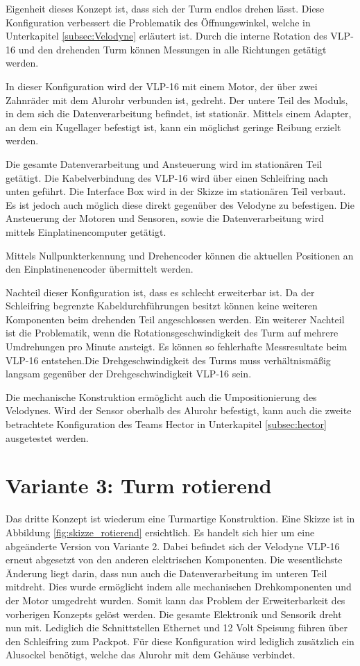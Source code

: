 Eigenheit dieses Konzept ist, dass sich der Turm endlos drehen lässt. Diese Konfiguration verbessert die Problematik des Öffnungswinkel, welche in Unterkapitel \ref{subsec:Velodyne} erläutert ist. Durch die interne Rotation des VLP-16 und den drehenden Turm können Messungen in alle Richtungen getätigt werden. 

In dieser Konfiguration wird der VLP-16 mit einem Motor, der über zwei Zahnräder mit dem Alurohr verbunden ist, gedreht. Der untere Teil des Moduls, in dem sich die Datenverarbeitung befindet, ist stationär. Mittels einem Adapter, an dem ein Kugellager befestigt ist, kann ein möglichst geringe Reibung erzielt werden.

Die gesamte Datenverarbeitung und Ansteuerung wird im stationären Teil getätigt. Die Kabelverbindung des VLP-16 wird über einen Schleifring nach unten geführt. Die Interface Box wird in der Skizze im stationären Teil verbaut. Es ist jedoch auch möglich diese direkt gegenüber des Velodyne zu befestigen. Die Ansteuerung der Motoren und Sensoren, sowie die Datenverarbeitung wird mittels Einplatinencomputer getätigt.

Mittels Nullpunkterkennung und Drehencoder können die aktuellen Positionen an den Einplatinenencoder übermittelt werden.

Nachteil dieser Konfiguration ist, dass es schlecht erweiterbar ist. Da der Schleifring begrenzte Kabeldurchführungen besitzt können keine weiteren Komponenten beim drehenden Teil angeschlossen werden. Ein weiterer Nachteil ist die Problematik, wenn die Rotationsgeschwindigkeit des Turm auf mehrere Umdrehungen pro Minute ansteigt. Es können so fehlerhafte Messresultate beim VLP-16 entstehen.Die Drehgeschwindigkeit des Turms muss verhältnismäßig langsam gegenüber der Drehgeschwindigkeit VLP-16 sein.

Die mechanische Konstruktion ermöglicht auch die Umpositionierung des Velodynes. Wird der Sensor oberhalb des Alurohr befestigt, kann auch die zweite betrachtete Konfiguration des Teams Hector in Unterkapitel \ref{subsec:hector} ausgetestet werden.

\section {Variante 3: Turm rotierend}
\label{sec:var3}
Das dritte Konzept ist wiederum eine Turmartige Konstruktion. Eine Skizze ist in Abbildung \ref{fig:skizze_rotierend} ersichtlich. Es handelt sich hier um eine abgeänderte Version von Variante 2. Dabei befindet sich der Velodyne VLP-16 erneut abgesetzt von den anderen elektrischen Komponenten. Die wesentlichste Änderung liegt darin, dass nun auch die Datenverarbeitung im unteren Teil mitdreht. 
Dies wurde ermöglicht indem alle mechanischen Drehkomponenten und der Motor umgedreht wurden. Somit kann das Problem der Erweiterbarkeit des vorherigen Konzepts gelöst werden. Die gesamte Elektronik und Sensorik dreht nun mit. Lediglich die Schnittstellen Ethernet und 12 Volt Speisung führen über den Schleifring zum Packpot. Für diese Konfiguration wird lediglich zusätzlich ein Alusockel benötigt, welche das Alurohr mit dem Gehäuse verbindet. 

